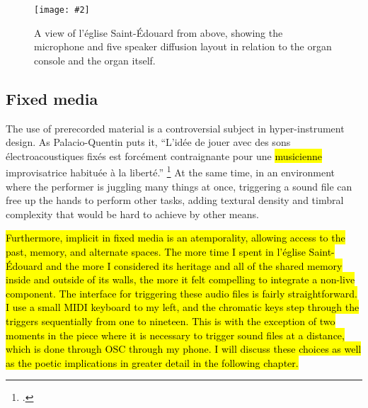 \documentclass[12pt,twoside,maitrise]{dms_ks}
\newcommand{\customincludegraphics}[4][]{%
    \begin{figure}[H]
        \centering
        \texttt{[image: \#2]}
        \caption{#4}
	\label{#3} 
    \end{figure}
}
\theoremstyle{definition}
\begin{document}
{\customincludegraphics[scale=0.28]{stageplot_ste-edouard2}{fig:stageplot}{A view of l'église Saint-Édouard from above, showing the microphone and five speaker diffusion layout in relation to the organ console and the organ itself.}

\subsection{Fixed media}

The use of prerecorded material is a controversial subject in hyper-instrument design.
As Palacio-Quentin puts it, “L’idée de jouer avec des sons électroacoustiques fixés est forcément contraignante pour une \hl{musicienne} improvisatrice habituée à la liberté.” \footcite[50]{palacio-quintin_composition_2012-1}
At the same time, in an environment where the performer is juggling many things at once, triggering a sound file can free up the hands to perform other tasks, adding textural density and timbral complexity that would be hard to achieve by other means. 


\hl{Furthermore, implicit in fixed media is an atemporality, allowing access to the past, memory, and alternate spaces.
The more time I spent in l'église Saint-Édouard and the more I considered its heritage and all of the shared memory inside and outside of its walls, the more it felt compelling to integrate a non-live component.
The interface for triggering these audio files is fairly straightforward.
I use a small MIDI keyboard to my left, and the chromatic keys step through the triggers sequentially from one to nineteen. 
This is with the exception of two moments in the piece where it is necessary to trigger sound files at a distance, which is done through OSC through my phone.
I will discuss these choices as well as the poetic implications in greater detail in the following chapter.}



}
\end{document}
